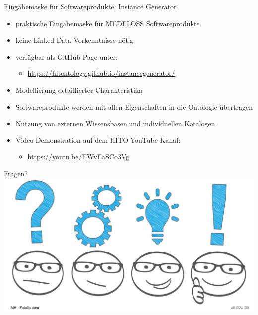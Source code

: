 \documentclass[aspectratio=1610,12pt]{beamer}
\begin{document}
\begin{frame}{Eingabemaske für Softwareprodukte: Instance Generator}
\begin{spacing}{1.25}
\begin{itemize}
\item praktische Eingabemaske für MEDFLOSS Softwareprodukte
\item keine Linked Data Vorkenntnisse nötig
\item verfügbar als GitHub Page unter:
\begin{itemize}
\item \url{https://hitontology.github.io/instancegenerator/}
\end{itemize}
\item Modellierung detaillierter Charakteristika
\item Softwareprodukte werden mit allen Eigenschaften in die Ontologie übertragen
\item Nutzung von externen Wissensbasen und individuellen Katalogen
\item Video-Demonstration auf dem HITO YouTube-Kanal:
\begin{itemize}
\item \url{https://youtu.be/EWvEaSCo3Vg}
\end{itemize}
\end{itemize}
\end{spacing}
\end{frame}

\begin{frame}{Fragen?}
  \centering
  \vspace{-0.5cm}
  \includegraphics[width=\textwidth]{img/fragen.png}
\end{frame}

\end{document}
